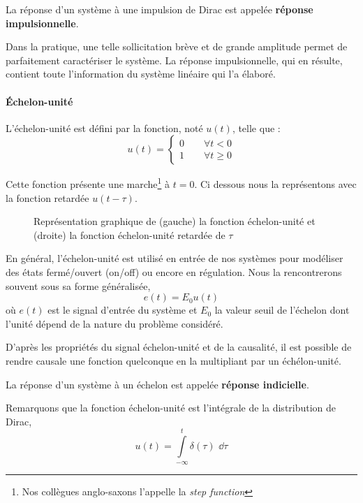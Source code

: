 La réponse d'un système à une impulsion de Dirac est appelée 
\textbf{réponse impulsionnelle}.

Dans la pratique, une telle sollicitation brève et de grande amplitude
permet de parfaitement caractériser le système. La réponse impulsionnelle, 
qui en résulte, contient toute l'information du système 
linéaire qui l'a élaboré.

\paragraph{\'Echelon-unité}
L'échelon-unité est défini par la fonction, noté $u(t)$, telle que :
$$
u(t)=
\begin{cases} 
0 \qquad \forall t<0    \\ 
1 \qquad \forall t\geq 0 
\end{cases}
$$

Cette fonction présente une marche\footnote{Nos 
collègues anglo-saxons l'appelle la \og\emph{step function}\fg} à $t=0$. 
Ci dessous nous la représentons avec la fonction retardée $u(t-\tau)$.
\begin{figure}[!h]
\begin{center}

\end{center}
\caption{Représentation graphique de (gauche) la fonction échelon-unité 
         et (droite) la fonction échelon-unité retardée de $\tau$
         \label{fig-echelon}}
\end{figure}

En général, l'échelon-unité est utilisé en entrée de nos systèmes pour 
modéliser des états fermé/ouvert (\og on/off\fg) ou encore en régulation.
Nous la rencontrerons souvent sous sa forme généralisée, 
$$
e(t)=E_0u(t)
$$
où $e(t)$ est le signal d'entrée du système et $E_0$ la valeur seuil 
de l'échelon dont l'unité dépend de la nature du problème considéré.

D'après les propriétés du signal échelon-unité et de la causalité, il 
est possible de rendre causale une fonction quelconque en la 
multipliant par un échélon-unité.

La réponse d'un système à un échelon est appelée 
\textbf{réponse indicielle}.

Remarquons que la fonction échelon-unité est l'intégrale 
de la distribution de Dirac,
$$
u(t)=\int\limits_{-\infty}^{t} \delta(\tau)\,\,\dd{\tau}
$$


